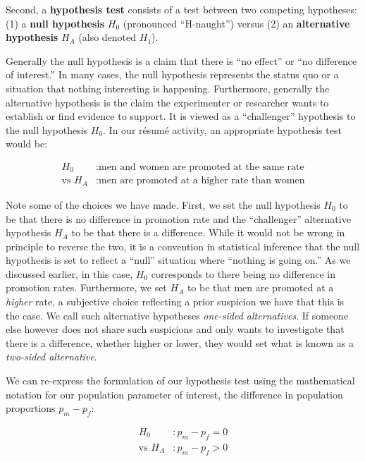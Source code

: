 \documentclass[
]{book}
\begin{document}
Second, a \textbf{hypothesis test}  consists of a test between two competing hypotheses: (1) a \textbf{null hypothesis} \(H_0\) (pronounced ``H-naught'') versus (2) an \textbf{alternative hypothesis} \(H_A\) (also denoted \(H_1\)).

Generally the null hypothesis  is a claim that there is ``no effect'' or ``no difference of interest.'' In many cases, the null hypothesis represents the status quo or a situation that nothing interesting is happening. Furthermore, generally the alternative hypothesis  is the claim the experimenter or researcher wants to establish or find evidence to support. It is viewed as a ``challenger'' hypothesis to the null hypothesis \(H_0\). In our résumé activity, an appropriate hypothesis test would be:

\[
\begin{aligned}
H_0 &: \text{men and women are promoted at the same rate}\\
\text{vs } H_A &: \text{men are promoted at a higher rate than women}
\end{aligned}
\]

Note some of the choices we have made. First, we set the null hypothesis \(H_0\) to be that there is no difference in promotion rate and the ``challenger'' alternative hypothesis \(H_A\) to be that there is a difference. While it would not be wrong in principle to reverse the two, it is a convention in statistical inference that the null hypothesis is set to reflect a ``null'' situation where ``nothing is going on.'' As we discussed earlier, in this case, \(H_0\) corresponds to there being no difference in promotion rates. Furthermore, we set \(H_A\) to be that men are promoted at a \emph{higher} rate, a subjective choice reflecting a prior suspicion we have that this is the case. We call such alternative hypotheses  \emph{one-sided alternatives}. If someone else however does not share such suspicions and only wants to investigate that there is a difference, whether higher or lower, they would set what is known as a  \emph{two-sided alternative}.

We can re-express the formulation of our hypothesis test using the mathematical notation for our population parameter of interest, the difference in population proportions \(p_{m} - p_{f}\):

\[
\begin{aligned}
H_0 &: p_{m} - p_{f} = 0\\
\text{vs } H_A&: p_{m} - p_{f} > 0
\end{aligned}
\]
\end{document}
